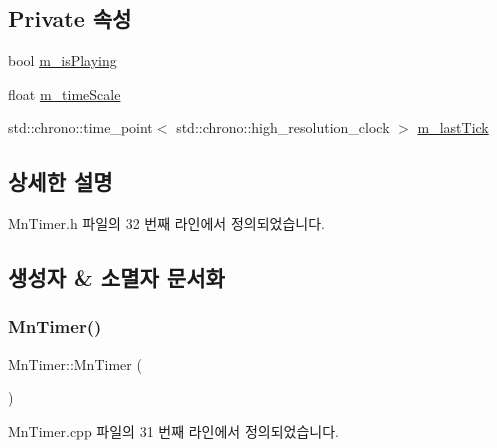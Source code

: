 \subsection*{Private 속성}
\begin{DoxyCompactItemize}
\item 
bool \hyperlink{class_m_n_l_1_1_mn_timer_a297ca44e41691a6fa7b83d8d98e6b463}{m\+\_\+is\+Playing}
\item 
float \hyperlink{class_m_n_l_1_1_mn_timer_aaaa9922dcae0495a530c73683d8b7adf}{m\+\_\+time\+Scale}
\item 
std\+::chrono\+::time\+\_\+point$<$ std\+::chrono\+::high\+\_\+resolution\+\_\+clock $>$ \hyperlink{class_m_n_l_1_1_mn_timer_a7158458bc690aec6a795242f6251ad40}{m\+\_\+last\+Tick}
\end{DoxyCompactItemize}


\subsection{상세한 설명}


Mn\+Timer.\+h 파일의 32 번째 라인에서 정의되었습니다.



\subsection{생성자 \& 소멸자 문서화}
\mbox{\label{class_m_n_l_1_1_mn_timer_aee4e048c674d82feeaadfad258ed0a5b}} 
\subsubsection{\texorpdfstring{Mn\+Timer()}{MnTimer()}}
{\footnotesize\ttfamily Mn\+Timer\+::\+Mn\+Timer (\begin{DoxyParamCaption}{ }\end{DoxyParamCaption})}



Mn\+Timer.\+cpp 파일의 31 번째 라인에서 정의되었습니다.

\mbox{\label{class_m_n_l_1_1_mn_timer_a97457692c75d5d249d2ad2bc28f2ecc4}} 
